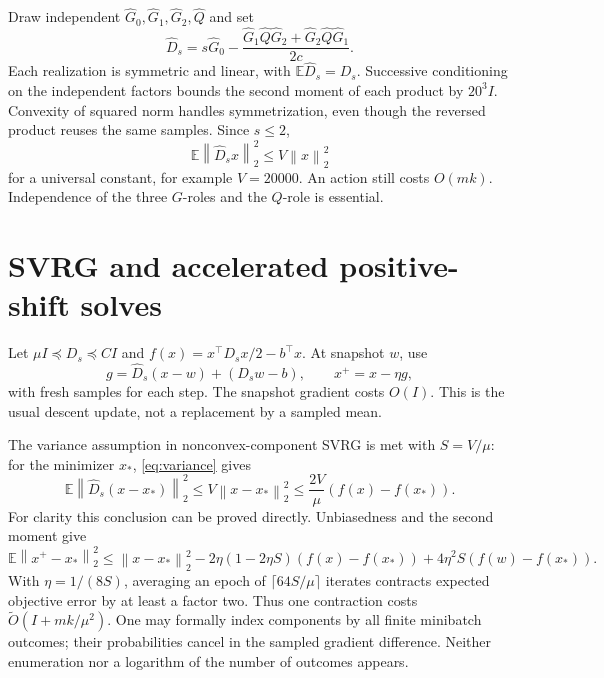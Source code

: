 \documentclass[11pt]{article}
\newcommand{\norm}[1]{\left\lVert#1\right\rVert}
\begin{document}
Draw independent \(\widehat G_0,\widehat G_1,\widehat G_2,\widehat Q\)
and set
\[
 \widehat D_s=s\widehat G_0-
   \frac{\widehat G_1\widehat Q\widehat G_2+
         \widehat G_2\widehat Q\widehat G_1}{2c}.
\]
Each realization is symmetric and linear, with
\(\mathbb E\widehat D_s=D_s\). Successive conditioning on the independent
factors bounds the second moment of each product by \(20^3I\).
Convexity of squared norm handles symmetrization, even though the
reversed product reuses the same samples. Since \(s\leq2\),
\begin{equation}\label{eq:variance}
 \mathbb E\norm{\widehat D_s x}_2^2\leq V\norm x_2^2
\end{equation}
for a universal constant, for example \(V=20000\).
An action still costs \(O(mk)\). Independence of the three \(G\)-roles
and the \(Q\)-role is essential.

\section{SVRG and accelerated positive-shift solves}
Let \(\mu I\preceq D_s\preceq CI\) and
\(f(x)=x^\top D_sx/2-b^\top x\). At snapshot \(w\), use
\[
 g=\widehat D_s(x-w)+(D_sw-b),\qquad x^+=x-\eta g,
\]
with fresh samples for each step. The snapshot gradient costs \(O(I)\).
This is the usual descent update, not a replacement by a sampled mean.

The variance assumption in nonconvex-component SVRG
\cite[Theorem 9]{garber} is met with \(S=V/\mu\):
for the minimizer \(x_*\), \eqref{eq:variance} gives
\[
 \mathbb E\norm{\widehat D_s(x-x_*)}_2^2
 \leq V\norm{x-x_*}_2^2
 \leq\frac{2V}{\mu}(f(x)-f(x_*)).
\]
For clarity this conclusion can be proved directly. Unbiasedness and
the second moment give
\[
 \mathbb E\norm{x^+-x_*}_2^2
 \leq\norm{x-x_*}_2^2
 -2\eta(1-2\eta S)(f(x)-f(x_*))
 +4\eta^2S(f(w)-f(x_*)).
\]
With \(\eta=1/(8S)\), averaging an epoch of
\(\lceil64S/\mu\rceil\) iterates contracts expected objective error
by at least a factor two. Thus one contraction costs
\(\widetilde O(I+mk/\mu^2)\).
One may formally index components by all finite minibatch outcomes;
their probabilities cancel in the sampled gradient difference.
Neither enumeration nor a logarithm of the number of outcomes appears.
\end{document}
